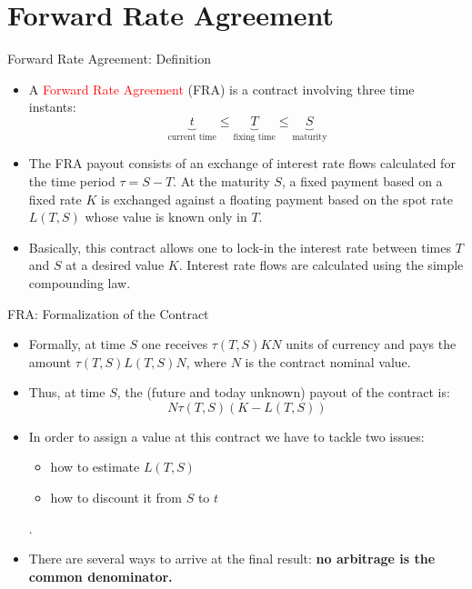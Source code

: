 \documentclass{beamer}
\begin{document}
\section{Forward Rate Agreement}
\begin{frame}{Forward Rate Agreement: Definition}
	\begin{itemize}	
		\item A \textcolor{red}{Forward Rate Agreement} (FRA) is a contract involving three time instants: %
		\begin{equation*}
			\underbrace{t}_{\text{current time}} \leq \underbrace{T}_{\text{fixing time}} \leq\underbrace{S}_{\text{maturity}}
		\end{equation*}
		\item The FRA payout consists of an exchange of interest rate flows calculated for the time period $\tau=S-T$. At the maturity $S$, a fixed payment based on a fixed rate $K$ is exchanged against a floating payment based on the spot rate $L(T, S)$ whose value is known only in $T$.
		\item Basically, this contract allows one to lock-in the interest rate between times $T$ and $S$ at a desired value $K$. Interest rate flows are calculated using the simple compounding law.
	\end{itemize}
\end{frame}

\begin{frame}{FRA: Formalization of the Contract}
	\begin{itemize}
		\item Formally, at time $S$ one receives $\tau(T, S)KN$ units of currency and pays the amount $\tau(T,S)L(T,S)N$, where $N$ is the contract nominal value.
		\item Thus, at time $S$, the (future and today unknown) payout of the contract is: 
		\begin{equation}
			N\tau(T,S)(K-L(T,S))
			\label{eq:fra_payoff}
		\end{equation}
		\item In order to assign a value at this contract we have to tackle two issues:
		\begin{itemize}
			\item how to estimate $L(T, S)$
			\item how to discount it from $S$ to $t$
		\end{itemize}.
		\item There are several ways to arrive at the final result: \textbf{no arbitrage is the common denominator.}
	\end{itemize}
\end{frame}
\end{document}

